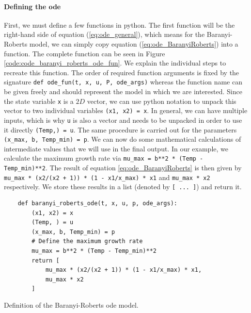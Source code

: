 \documentclass[10pt,A4paper]{article}
\begin{document}
\paragraph{Defining the \acs{ode}} First, we must define a few functions in python.
The first function will be the right-hand side of equation (\ref{eq:ode_general}), which means for the Baranyi-Roberts model, we can simply copy equation (\ref{eq:ode_BaranyiRoberts}) into a function.
The complete function can be seen in Figure \ref{code:code_baranyi_roberts_ode_fun}.
We explain the individual steps to recreate this function.
The order of required function arguments is fixed by the signature
\texttt{def ode_fun(t, x, u, P, ode_args)} whereas the function name can be given freely and should represent the model in which we are interested.
Since the state variable \texttt{x} is a $2D$ vector, we can use python notation to unpack this vector to two individual variables
\texttt{(x1, x2) = x}.
In general, we can have multiple inputs, which is why \texttt{u} is also a vector and needs to be unpacked in order to use it directly \texttt{(Temp,) = u}.
The same procedure is carried out for the parameters \texttt{(x_max, b, Temp_min) = p}.
We can now do some mathematical calculations of intermediate values that we will use in the final output.
In our example, we calculate the maximum growth rate via \texttt{mu_max = b**2 * (Temp - Temp_min)**2}.
The result of equation \ref{eq:ode_BaranyiRoberts} is then given by \texttt{mu_max * (x2/(x2 + 1)) * (1 - x1/x_max) * x1} and 
\texttt{mu_max * x2} respectively.
We store these results in a list (denoted by \texttt{[ ... ]}) and return it.
\begin{code}[h]
    \begin{verbatim}
    def baranyi_roberts_ode(t, x, u, p, ode_args):
        (x1, x2) = x
        (Temp, ) = u
        (x_max, b, Temp_min) = p
        # Define the maximum growth rate
        mu_max = b**2 * (Temp - Temp_min)**2
        return [
            mu_max * (x2/(x2 + 1)) * (1 - x1/x_max) * x1,
            mu_max * x2
        ]
    \end{verbatim}
    \caption{Definition of the Baranyi-Roberts \ac{ode} model.}
    \label{code:code_baranyi_roberts_ode_fun}
\end{code}
%
\end{document}
